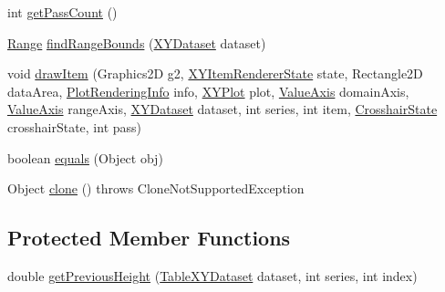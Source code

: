 \begin{DoxyCompactItemize}
\item 
int \mbox{\hyperlink{classorg_1_1jfree_1_1chart_1_1renderer_1_1xy_1_1_stacked_x_y_area_renderer_aebe9cf5b4e1b6f95b2abb9fce060163c}{get\+Pass\+Count}} ()
\item 
\mbox{\hyperlink{classorg_1_1jfree_1_1data_1_1_range}{Range}} \mbox{\hyperlink{classorg_1_1jfree_1_1chart_1_1renderer_1_1xy_1_1_stacked_x_y_area_renderer_a86d3a07a94f65c8b11ed90e0b2f61df3}{find\+Range\+Bounds}} (\mbox{\hyperlink{interfaceorg_1_1jfree_1_1data_1_1xy_1_1_x_y_dataset}{X\+Y\+Dataset}} dataset)
\item 
void \mbox{\hyperlink{classorg_1_1jfree_1_1chart_1_1renderer_1_1xy_1_1_stacked_x_y_area_renderer_a5cf251068f60f406db8d44f4a6d783eb}{draw\+Item}} (Graphics2D g2, \mbox{\hyperlink{classorg_1_1jfree_1_1chart_1_1renderer_1_1xy_1_1_x_y_item_renderer_state}{X\+Y\+Item\+Renderer\+State}} state, Rectangle2D data\+Area, \mbox{\hyperlink{classorg_1_1jfree_1_1chart_1_1plot_1_1_plot_rendering_info}{Plot\+Rendering\+Info}} info, \mbox{\hyperlink{classorg_1_1jfree_1_1chart_1_1plot_1_1_x_y_plot}{X\+Y\+Plot}} plot, \mbox{\hyperlink{classorg_1_1jfree_1_1chart_1_1axis_1_1_value_axis}{Value\+Axis}} domain\+Axis, \mbox{\hyperlink{classorg_1_1jfree_1_1chart_1_1axis_1_1_value_axis}{Value\+Axis}} range\+Axis, \mbox{\hyperlink{interfaceorg_1_1jfree_1_1data_1_1xy_1_1_x_y_dataset}{X\+Y\+Dataset}} dataset, int series, int item, \mbox{\hyperlink{classorg_1_1jfree_1_1chart_1_1plot_1_1_crosshair_state}{Crosshair\+State}} crosshair\+State, int pass)
\item 
boolean \mbox{\hyperlink{classorg_1_1jfree_1_1chart_1_1renderer_1_1xy_1_1_stacked_x_y_area_renderer_af08a139150b9c41f9bed463d14a8c444}{equals}} (Object obj)
\item 
Object \mbox{\hyperlink{classorg_1_1jfree_1_1chart_1_1renderer_1_1xy_1_1_stacked_x_y_area_renderer_a7bb8f9d82b4dcb34cb9e8add37264581}{clone}} ()  throws Clone\+Not\+Supported\+Exception 
\end{DoxyCompactItemize}
\subsection*{Protected Member Functions}
\begin{DoxyCompactItemize}
\item 
double \mbox{\hyperlink{classorg_1_1jfree_1_1chart_1_1renderer_1_1xy_1_1_stacked_x_y_area_renderer_ae718562587452aa3ac1c8e08b2debfb5}{get\+Previous\+Height}} (\mbox{\hyperlink{interfaceorg_1_1jfree_1_1data_1_1xy_1_1_table_x_y_dataset}{Table\+X\+Y\+Dataset}} dataset, int series, int index)
\end{DoxyCompactItemize}
